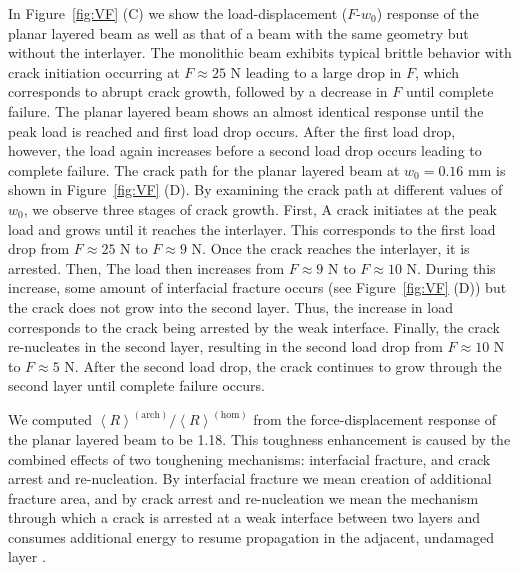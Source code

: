 \documentclass[12pt,onecolumn]{article}
\begin{document}
In Figure~\ref{fig:VF} (C) we show the load-displacement ($F$-$w_0$) response of the planar layered beam as well as that of a beam with the same geometry but without the interlayer. The monolithic beam exhibits typical brittle behavior with crack initiation occurring at $F\approx25$ N leading to a large drop in $F$, which corresponds to abrupt crack growth, followed by a decrease in $F$ until complete failure. The planar layered beam shows an almost identical response until the peak load is reached and first load drop occurs. After the first load drop, however, the load again increases before a second load drop occurs leading to complete failure. The crack path for the planar layered beam at $w_0 = 0.16$ mm is shown in Figure~\ref{fig:VF} (D). By examining the crack path at different values of $w_0$, we observe three stages of crack growth. First, A crack initiates at the peak load and grows until it reaches the interlayer. This corresponds to the first load drop from $F \approx 25$ N to $F \approx 9$ N. Once the crack reaches the interlayer, it is arrested. Then, The load then increases from $F \approx 9$ N to $F \approx 10$ N. During this increase, some amount of interfacial fracture occurs (see Figure~\ref{fig:VF} (D)) but the crack does not grow into the second layer. Thus, the increase in load corresponds to the crack being arrested by the weak interface. Finally, the crack re-nucleates in the second layer, resulting in the second load drop from $F \approx 10$ N to $F \approx 5$ N. After the second load drop, the crack continues to grow through the second layer until complete failure occurs.


We computed $\left< R\right>^{(\mathrm{arch})}/\left< R\right>^{(\mathrm{hom})}$ from the force-displacement response of the planar layered beam to be 1.18. This toughness enhancement is caused by the combined effects of two toughening mechanisms: interfacial fracture, and crack arrest and re-nucleation. By interfacial fracture we mean creation of additional fracture area, and by crack arrest and re-nucleation we mean the mechanism through which a crack is arrested at a weak interface between two layers and consumes additional energy to resume propagation in the adjacent, undamaged layer \cite{cook1964mechanism,jackson1988,currey1977,kuhn1996fracture, kamat2000structural}.
\end{document}
